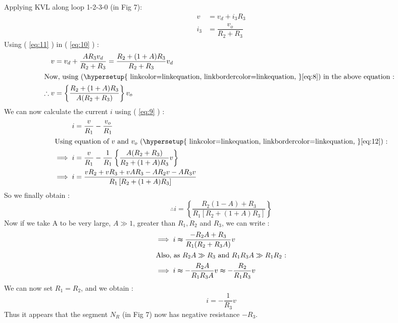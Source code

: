 \documentclass[12pt]{article}
\newcommand*{\myref}[1]{%
  \begingroup
    \hypersetup{
      linkcolor=linkequation,
      linkbordercolor=linkequation,
    }%
    \ref{#1}%
  \endgroup
}
\begin{document}
Applying KVL along loop 1-2-3-0 (in Fig 7):
\begin{align}
	v&=v_d + i_3R_3 \label{eq:10} \\
	i_3&=\dfrac{v_o}{R_2+R_3} \label{eq:11}
\end{align}
Using (\myref{eq:11}) in (\myref{eq:10}) :
\begin{align}
	v&=v_d + \dfrac{A R_3 v_d}{R_2+R_3} = \dfrac{R_2+(1+A)R_3}{R_2+R_3}v_d \nonumber \\
	\intertext{Now, using (\myref{eq:8}) in the above equation : }
	\therefore v&= \left\{ \dfrac{R_2+(1+A)R_3}{A(R_2+R_3)} \right\}v_o \label{eq:12}
\end{align}
We can now calculate the current $i$ using (\myref{eq:9}) :
\begin{align*}
	i&=\dfrac{v}{R_1}-\dfrac{v_o}{R_1} \\
	\intertext{Using equation of $v$ and $v_o$ (\myref{eq:12}) :}
	\implies i &= \dfrac{v}{R_1}-\dfrac{1}{R_1}\left\{ \dfrac{A(R_2+R_3)}{R_2+(1+A)R_3}v \right\} \\
	\implies i &= \dfrac{vR_2+vR_3+vAR_3-AR_2v-AR_3v}{R_1\left[ R_2+(1+A)R_3 \right]}
\end{align*}
So we finally obtain :
\begin{equation}
	\therefore i = \left\{ \dfrac{R_2(1-A)+R_3}{R_1\left[ R_2+(1+A)R_3 \right] } \right\} \label{eq:13}
\end{equation}
Now if we take A to be very large, $A\gg 1$, greater than $R_1, R_2$ and $R_3$, we can write :
\begin{align*}
	\implies i & \thickapprox \dfrac{-R_2A+R_3}{R_1(R_2+R_3A)}v \\
	\intertext{Also, as $R_2A \gg R_3$ and $R_1R_3A \gg R_1R_2$ :}
	\implies i & \thickapprox -\dfrac{R_2A}{R_1R_3A}v \thickapprox -\dfrac{R_2}{R_1R_3}v
\end{align*}
We can now set $R_1=R_2$, and we obtain :
\begin{equation}
	i=-\dfrac{1}{R_3}v \label{eq:14}
\end{equation}
Thus it appears that the segment $N_R$ (in Fig 7) now has negative resistance $-R_3$. 
%
\end{document}
